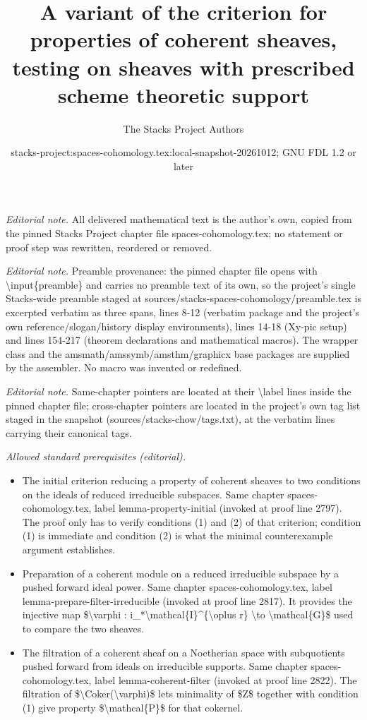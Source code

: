 \documentclass[10pt,a4paper]{amsart}
\title{A variant of the criterion for properties of coherent sheaves, testing on sheaves with prescribed scheme theoretic support}
\author{The Stacks Project Authors}
\date{stacks-project:spaces-cohomology.tex:local-snapshot-20261012; GNU FDL 1.2 or later}
\theoremstyle{plain}
\theoremstyle{definition}
\theoremstyle{remark}
\numberwithin{equation}{subsection}
\begin{document}
\maketitle
\noindent\textit{Editorial note.} All delivered mathematical text is the author's own, copied from the pinned Stacks Project chapter file spaces-cohomology.tex; no statement or proof step was rewritten, reordered or removed.\par\medskip
\noindent\textit{Editorial note.} Preamble provenance: the pinned chapter file opens with \textbackslash{}input\{preamble\} and carries no preamble text of its own, so the project's single Stacks-wide preamble staged at sources/stacks-spaces-cohomology/preamble.tex is excerpted verbatim as three spans, lines 8-12 (verbatim package and the project's own reference/slogan/history display environments), lines 14-18 (Xy-pic setup) and lines 154-217 (theorem declarations and mathematical macros). The wrapper class and the amsmath/amssymb/amsthm/graphicx base packages are supplied by the assembler. No macro was invented or redefined.\par\medskip
\noindent\textit{Editorial note.} Same-chapter pointers are located at their \textbackslash{}label lines inside the pinned chapter file; cross-chapter pointers are located in the project's own tag list staged in the snapshot (sources/stacks-chow/tags.txt), at the verbatim lines carrying their canonical tags.\par\medskip
\noindent\textit{Allowed standard prerequisites (editorial).}\begin{itemize}
\item The initial criterion reducing a property of coherent sheaves to two conditions on the ideals of reduced irreducible subspaces. Same chapter spaces-cohomology.tex, label lemma-property-initial (invoked at proof line 2797). The proof only has to verify conditions (1) and (2) of that criterion; condition (1) is immediate and condition (2) is what the minimal counterexample argument establishes.
\item Preparation of a coherent module on a reduced irreducible subspace by a pushed forward ideal power. Same chapter spaces-cohomology.tex, label lemma-prepare-filter-irreducible (invoked at proof line 2817). It provides the injective map \$\textbackslash{}varphi : i\_*\textbackslash{}mathcal\{I\}\textasciicircum{}\{\textbackslash{}oplus r\} \textbackslash{}to \textbackslash{}mathcal\{G\}\$ used to compare the two sheaves.
\item The filtration of a coherent sheaf on a Noetherian space with subquotients pushed forward from ideals on irreducible supports. Same chapter spaces-cohomology.tex, label lemma-coherent-filter (invoked at proof line 2822). The filtration of \$\textbackslash{}Coker(\textbackslash{}varphi)\$ lets minimality of \$Z\$ together with condition (1) give property \$\textbackslash{}mathcal\{P\}\$ for that cokernel.
\end{itemize}\medskip
\end{document}
